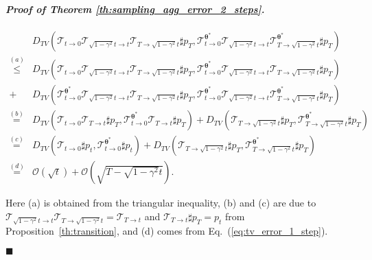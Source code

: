 \documentclass{article} \usepackage{iclr2024_coNFErence,times}
\def\eqref#1{equation~\ref{#1}}
\newenvironment{myproof}[2]{\paragraph{\textit{Proof of {#1} {#2}. }}}{\hfill$\blacksquare$}
\def\eqref#1{(\ref{#1})}
\def\eqref#1{(\ref{#1})}
\theoremstyle{definition}
\theoremstyle{remark}
\begin{document}
\begin{myproof}{Theorem}{\ref{th:sampling_agg_error_2_steps}}
\begin{align*}
    &D_{TV}\left(\mathcal{T}_{t\rightarrow 0}\mathcal{T}_{\sqrt{1-\gamma^2}t\rightarrow t}\mathcal{T}_{T\rightarrow\sqrt{1-\gamma^2}t}\sharp p_T, \mathcal{T}_{t\rightarrow 0}^{\bm{\theta}^* }\mathcal{T}_{\sqrt{1-\gamma^2}t\rightarrow t}\mathcal{T}_{T\rightarrow\sqrt{1-\gamma^2}t}^{\bm{\theta}^* }\sharp p_T\right)
    \\  \overset{(a)}{\leq} &D_{TV}\left(\mathcal{T}_{t\rightarrow 0}\mathcal{T}_{\sqrt{1-\gamma^2}t\rightarrow t}\mathcal{T}_{T\rightarrow\sqrt{1-\gamma^2}t}\sharp p_T, \mathcal{T}_{t\rightarrow 0}^{\bm{\theta}^* }\mathcal{T}_{\sqrt{1-\gamma^2}t\rightarrow t}\mathcal{T}_{T\rightarrow\sqrt{1-\gamma^2}t}\sharp p_T\right)
    \\  + &D_{TV}\left(\mathcal{T}_{t\rightarrow 0}^{\bm{\theta}^* }\mathcal{T}_{\sqrt{1-\gamma^2}t\rightarrow t}\mathcal{T}_{T\rightarrow\sqrt{1-\gamma^2}t}\sharp p_T,\mathcal{T}_{t\rightarrow 0}^{\bm{\theta}^* }\mathcal{T}_{\sqrt{1-\gamma^2}t\rightarrow t}\mathcal{T}_{T\rightarrow\sqrt{1-\gamma^2}t}^{\bm{\theta}^* }\sharp p_T\right)
    \\  \overset{(b)}{=}&D_{TV}\left(\mathcal{T}_{t\rightarrow 0}\mathcal{T}_{T\rightarrow t}\sharp p_T, \mathcal{T}_{t\rightarrow 0}^{\bm{\theta}^* }\mathcal{T}_{T\rightarrow t}\sharp p_T\right) + D_{TV}\left(\mathcal{T}_{T\rightarrow\sqrt{1-\gamma^2}t}\sharp p_T,\mathcal{T}_{T\rightarrow\sqrt{1-\gamma^2}t}^{\bm{\theta}^* }\sharp p_T\right)
    \\ \overset{(c)}{=}&D_{TV}\left(\mathcal{T}_{t\rightarrow 0}\sharp p_t, \mathcal{T}_{t\rightarrow 0}^{\bm{\theta}^* }\sharp p_t\right) + D_{TV}\left(\mathcal{T}_{T\rightarrow\sqrt{1-\gamma^2}t}\sharp p_T,\mathcal{T}_{T\rightarrow\sqrt{1-\gamma^2}t}^{\bm{\theta}^* }\sharp p_T\right)
    \\ \overset{(d)}{=}& \mathcal{O}(\sqrt{t}) + \mathcal{O}(\sqrt{T-\sqrt{1-\gamma^2}t}).
 \end{align*}

Here (a) is obtained from the triangular inequality, (b) and (c) are due to $\mathcal{T}_{\sqrt{1-\gamma^2}t\rightarrow t}\mathcal{T}_{T\rightarrow\sqrt{1-\gamma^2}t}=\mathcal{T}_{T\rightarrow t}$ and $\mathcal{T}_{T\rightarrow t}\sharp p_T=p_t$ from Proposition~\ref{th:transition}, and (d) comes from Eq.~\eqref{eq:tv_error_1_step}.  
    
    

\end{myproof}
\end{document}
